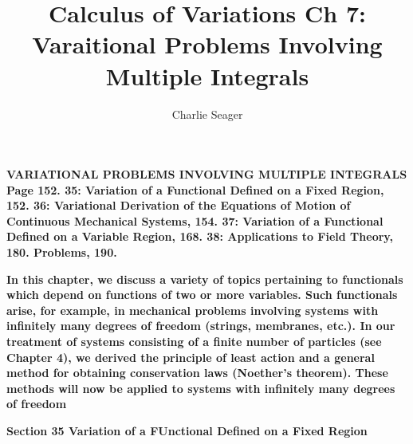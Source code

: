 \documentclass{article}
\begin{document}
\title {Calculus of Variations Ch 7: Varaitional Problems Involving Multiple Integrals}

\author{Charlie Seager}

\maketitle

\textbf {VARIATIONAL PROBLEMS INVOLVING MULTIPLE
INTEGRALS Page 152. 35: Variation of a Functional
Defined on a Fixed Region, 152. 36: Variational Derivation of the Equations of Motion of Continuous Mechanical Systems, 154. 37: Variation of a Functional
Defined on a Variable Region, 168. 38: Applications to
Field Theory, 180. Problems, 190. }

\textbf {In this chapter, we discuss a variety of topics pertaining to functionals
which depend on functions of two or more variables. Such functionals
arise, for example, in mechanical problems involving systems with infinitely
many degrees of freedom (strings, membranes, etc.). In our treatment of
systems consisting of a finite number of particles (see Chapter 4), we derived
the principle of least action and a general method for obtaining conservation
laws (Noether's theorem). These methods will now be applied to systems
with infinitely many degrees of freedom}

\textbf {Section 35 Variation of a FUnctional Defined on a Fixed Region}
\end{document}
